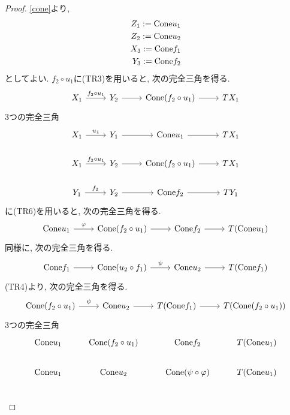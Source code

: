 \documentclass[uplatex, a4paper, 14Q, dvipdfmx]{jsarticle}
\begin{document}
\begin{proof}
  \cref{cone}より, 
  \begin{align*}
    Z_1 := \mathrm{Cone} u_1 \\
    Z_2 := \mathrm{Cone} u_2 \\
    X_3 := \mathrm{Cone} f_1 \\
    Y_3 := \mathrm{Cone} f_2 
  \end{align*}
  としてよい. 
  $f_2 \circ u_1$に(TR3)を用いると, 次の完全三角を得る.  
  \[\begin{tikzcd}
    {X_1} & {Y_2} & {\Cone (f_2 \circ u_1)} & {TX_1}
    \arrow["{f_2 \circ u_1}", from=1-1, to=1-2]
    \arrow[from=1-2, to=1-3]
    \arrow[from=1-3, to=1-4]
  \end{tikzcd}\]
  3つの完全三角
  \[\begin{tikzcd}
    {X_1} & {Y_1} & {\Cone u_1} & {TX_1} \\
    {X_1} & {Y_2} & {\Cone (f_2 \circ u_1)} & {TX_1} \\
    {Y_1} & {Y_2} & {\Cone f_2} & {TY_1}
    \arrow["{u_1}", from=1-1, to=1-2]
    \arrow[from=1-2, to=1-3]
    \arrow[from=1-3, to=1-4]
    \arrow[from=2-2, to=2-3]
    \arrow[from=2-3, to=2-4]
    \arrow["{f_2 \circ u_1}", from=2-1, to=2-2]
    \arrow["{f_2}", from=3-1, to=3-2]
    \arrow[from=3-2, to=3-3]
    \arrow[from=3-3, to=3-4]
  \end{tikzcd}\]
  に(TR6)を用いると, 次の完全三角を得る. 
  \[\begin{tikzcd}
    {\Cone u_1} & {\Cone (f_2 \circ u_1)} & {\Cone f_2} & {T(\Cone u_1)}
    \arrow["\varphi", from=1-1, to=1-2]
    \arrow[from=1-2, to=1-3]
    \arrow[from=1-3, to=1-4]
  \end{tikzcd}\]
  同様に, 次の完全三角を得る.  
  \[\begin{tikzcd}
    {\Cone f_1} & {\Cone (u_2 \circ f_1)} & {\Cone u_2} & {T(\Cone f_1)}
    \arrow[from=1-1, to=1-2]
    \arrow["\psi", from=1-2, to=1-3]
    \arrow[from=1-3, to=1-4]
  \end{tikzcd}\]
  (TR4)より, 次の完全三角を得る. 
  \[\begin{tikzcd}
    {\Cone (f_2 \circ u_1)} & {\Cone u_2} & {T(\Cone f_1)} & {T(\Cone (f_2 \circ u_1))}
    \arrow["\psi", from=1-1, to=1-2]
    \arrow[from=1-2, to=1-3]
    \arrow[from=1-3, to=1-4]
  \end{tikzcd}\]
  3つの完全三角
  \[\begin{tikzcd}
    {\Cone u_1} & {\Cone (f_2 \circ u_1)} & {\Cone f_2} & {T(\Cone u_1)} \\
    {\Cone u_1} & {\Cone u_2} & {\Cone (\psi \circ \varphi)} & {T(\Cone u_1)} \\

\end{tikzcd}\]
\end{proof}
\end{document}

